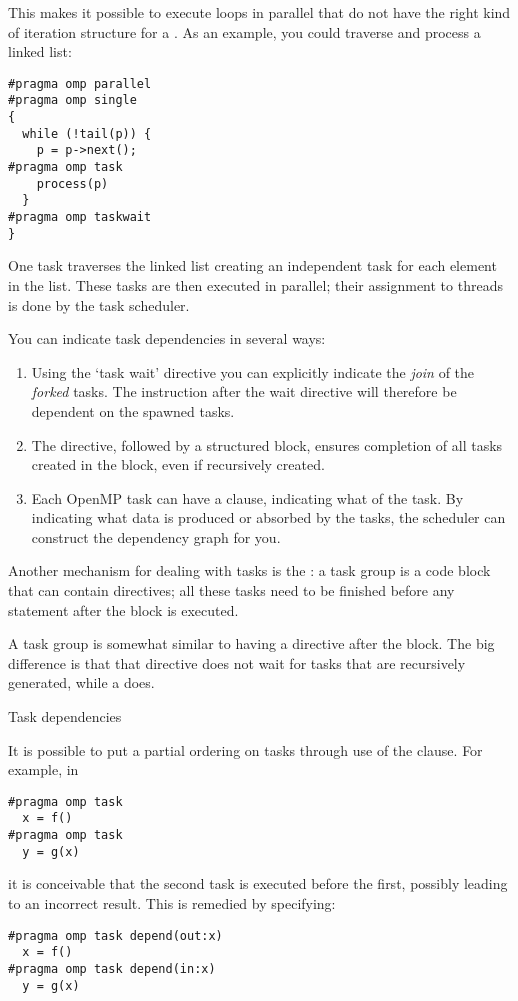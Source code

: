 This makes it possible to execute loops in parallel
that do not have the right kind of iteration structure
for a . As an example, you
could traverse and process a linked list:
\begin{lstlisting}
#pragma omp parallel
#pragma omp single
{
  while (!tail(p)) {
    p = p->next();
#pragma omp task
    process(p)
  }
#pragma omp taskwait
}
\end{lstlisting}
One task traverses the linked list creating an independent
task for each element in the list. These tasks are then
executed in parallel; their assignment to threads
is done by the task scheduler.

You can indicate task dependencies in several ways:
\begin{enumerate}
\item Using the `task wait' directive you can explicitly indicate
  the \emph{join} of the
  \emph{forked} tasks. The instruction after the wait directive
  will therefore be dependent on the spawned tasks.
\item The  directive, followed
  by a structured block, ensures completion of all tasks
  created in the block, even if recursively created.
\item Each OpenMP task can have a 
  clause, indicating what  of the task.
  By indicating what data is produced or absorbed by the tasks,
  the scheduler can construct the dependency graph for you.
\end{enumerate}

Another mechanism for dealing with tasks is the
: a task group is a code block that can
contain  directives; all these tasks need to be
finished before any statement after the block is executed.

A task group is somewhat similar to having a 
directive after the block. The big difference is that that
 directive does not wait for tasks that are recursively
generated, while a  does.


 {Task dependencies}

It is possible to put a partial ordering on
tasks through use of the  clause. For example, in
\begin{lstlisting}
#pragma omp task
  x = f()
#pragma omp task
  y = g(x)
\end{lstlisting}
it is conceivable that the second task is executed before the first,
possibly leading to an incorrect result. This is remedied by specifying:
\begin{lstlisting}
#pragma omp task depend(out:x)
  x = f()
#pragma omp task depend(in:x)
  y = g(x)
\end{lstlisting}

